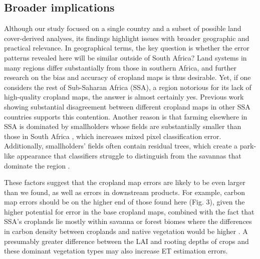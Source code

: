 \documentclass[12 pt, titlepage, a4paper]{article}
\begin{document}
\subsection*{Broader implications}
\vspace{-0.2 cm}
Although our study focused on a single country and a subset of possible land cover-derived analyses, its findings highlight issues with broader geographic and practical relevance. In geographical terms, the key question is whether the error patterns revealed here will be similar outside of South Africa? Land systems in many regions differ substantially from those in southern Africa, and further research on the bias and accuracy of cropland maps is thus desirable. Yet, if one considers the rest of Sub-Saharan Africa (SSA), a region notorious for its lack of high-quality cropland maps, the answer is almost certainly yes. Previous work showing substantial disagreement between different cropland maps in other SSA countries \citep{fritz_comparison_2010} supports this contention. Another reason is that farming elsewhere in SSA is dominated by smallholders whose fields are substantially smaller than those in South Africa \citep{samberg_subnational_2016}, which increases mixed pixel classification error. Additionally, smallholders' fields often contain residual trees, which create a park-like appearance that classifiers struggle to distinguish from the savannas that dominate the region \citep{estes_reconciling_2016,debats_generalized_2016,sweeney_mapping_2015}.   

These factors suggest that the cropland map errors are likely to be even larger than we found, as well as errors in downstream products. For example, carbon map errors should be on the higher end of those found here (Fig. 3), given the higher potential for error in the base cropland maps, combined with the fact that SSA's croplands lie mostly within savanna or forest biomes where the differences in carbon density between croplands and native vegetation would be higher \citep{searchinger_high_2015}. A presumably greater difference between the LAI and rooting depths of crops and these dominant vegetation types may also increase ET estimation errors.  
\end{document}
